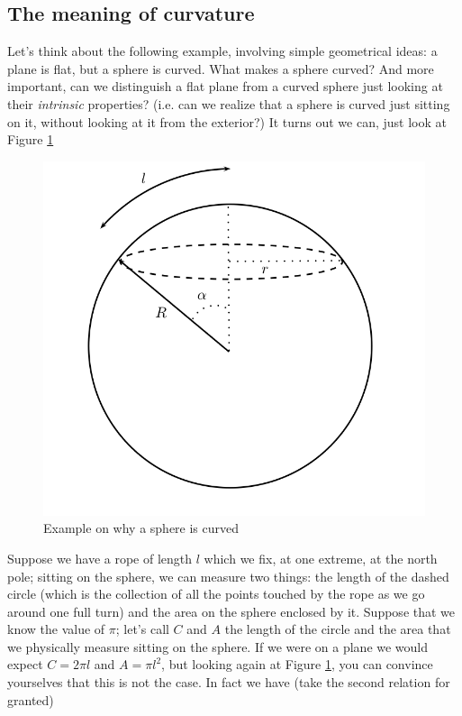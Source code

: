 \documentclass[11pt, a4paper,oneside,openright]{book}
\numberwithin{equation}{section}
\begin{document}
\subsection{The meaning of curvature}
Let's think about the following example, involving simple geometrical ideas: a plane is flat, but a sphere is curved. What makes a sphere curved? And more important, can we distinguish a flat plane from a curved sphere just looking at their \textit{intrinsic} properties? (i.e. can we realize that a sphere is curved just sitting on it, without looking at it from the exterior?) It turns out we can, just look at Figure \ref{sphere}
\begin{figure}
\begin{center}
\includegraphics[scale=0.7]{Draw/sphere.png}
\end{center}
\caption{Example on why a sphere is curved}
\label{sphere}
\end{figure}
Suppose we have a rope of length $l$ which we fix, at one extreme, at the north pole; sitting on the sphere, we can measure two things: the length of the dashed circle (which is the collection of all the points touched by the rope as we go around one full turn) and the area on the sphere enclosed by it. Suppose that we know the value of $\pi$; let's call $C$ and $A$ the length of the circle and the area that we physically measure sitting on the sphere. If we were on a plane we would expect $C=2\pi l$ and $A=\pi l^2$, but looking again at Figure \ref{sphere}, you can convince yourselves that this is not the case. In fact we have (take the second relation for granted)
\end{document}
